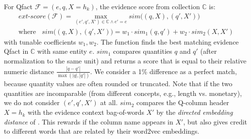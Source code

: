 \vspace{0.1cm}
For Qfact $\mathcal{F} = (e,q,X = h_k)$, the evidence score from
collection $\mathbb{C}$ is:
\begin{gather*}
\textit{ext-score}(\mathcal{F}) = \max\limits_{
(e',q',X') \in \mathbb{C} \wedge e'=e} \textit{sim}\big((q,X),  (q',X')\big)\\ 
\text{where}~~~~\textit{sim}\big((q,X),  (q',X')\big) =  w_1 \cdot \textit{sim}_1(q,q') + w_2 \cdot \textit{sim}_2(X,X')
\end{gather*}
with tunable coefficients $w_1, w_2$. The function finds the best matching evidence Qfact in $\mathbb{C}$ with same entity $e$.
$\textit{sim}_1$ compares quantities $q$ and $q'$
(after normalization to the same unit) and returns
a score that is 
equal
to their
relative numeric distance $\frac{|q - q'|}{\max(|q|,|q'|)}$.
We consider a 
1\% difference as a perfect match,
because quantity values are often rounded or truncated. 
Note that if the two quantities are incomparable (from different concepts, e.g., length vs. monetary), we do not consider $(e',q',X')$ at all.
$\textit{sim}_2$ compares the Q-column header $X = h_k$ with
the evidence context bag-of-words $X'$
by the {\em directed embedding distance} of \cite{DBLP:conf/semweb/HoIPBW19}.
This rewards if the column name appears in $X'$,
but also gives credit to different words that
are related by their word2vec embeddings.
%


